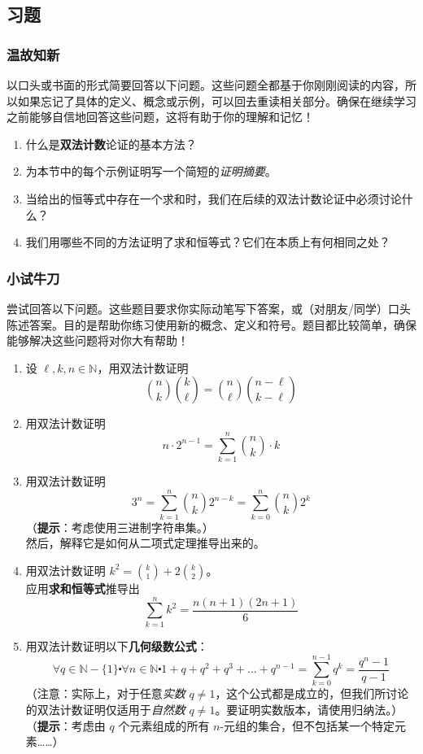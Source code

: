 
\subsection{习题}

\subsubsection*{温故知新}

以口头或书面的形式简要回答以下问题。这些问题全都基于你刚刚阅读的内容，所以如果忘记了具体的定义、概念或示例，可以回去重读相关部分。确保在继续学习之前能够自信地回答这些问题，这将有助于你的理解和记忆！

\begin{enumerate}[label=(\arabic*)]
    \item 什么是\textbf{双法计数}论证的基本方法？
    \item 为本节中的每个示例证明写一个简短的\emph{证明摘要}。
    \item 当给出的恒等式中存在一个求和时，我们在后续的双法计数论证中必须讨论什么？
    \item 我们用哪些不同的方法证明了求和恒等式？它们在本质上有何相同之处？
\end{enumerate}

\subsubsection*{小试牛刀}

尝试回答以下问题。这些题目要求你实际动笔写下答案，或（对朋友/同学）口头陈述答案。目的是帮助你练习使用新的概念、定义和符号。题目都比较简单，确保能够解决这些问题将对你大有帮助！

\begin{enumerate}[label=(\arabic*)]
    \item 设 $\ell,k,n \in \mathbb{N}$，用双法计数证明
        \[{n \choose k}{k \choose \ell}={n \choose \ell}{n-\ell \choose k-\ell}\]
    \item 用双法计数证明
        \[n \cdot 2^{n-1} = \sum_{k=1}^{n}{n \choose k} \cdot k\]
    \item 用双法计数证明
        \[3^n=\sum_{k=1}^{n}{n \choose k}2^{n-k} = \sum_{k=0}^{n}{n \choose k}2^k\]
        （\textbf{提示}：考虑使用三进制字符串集。）\\
        然后，解释它是如何从二项式定理推导出来的。
    \item 用双法计数证明 $k^2={k \choose 1}+2{k \choose 2}$。\\
        应用\textbf{求和恒等式}推导出
        \[\sum_{k=1}^{n} k^2 = \frac{n(n+1)(2n+1)}{6}\]
    \item 用双法计数证明以下\textbf{几何级数公式}：
    \[\forall q \in \mathbb{N}-\{1\} \centerdot \forall n \in \mathbb{N} \centerdot 1+q+q^2+q^3+\dots+q^{n-1} = \sum_{k=0}^{n-1}q^k = \frac{q^n-1}{q-1}\]
    （注意：实际上，对于任意\emph{实数} $q \ne 1$，这个公式都是成立的，但我们所讨论的双法计数证明仅适用于\emph{自然数} $q \ne 1$。要证明实数版本，请使用归纳法。）\\
    （\textbf{提示}：考虑由 $q$ 个元素组成的所有 $n$-元组的集合，但不包括某一个特定元素……）
\end{enumerate}